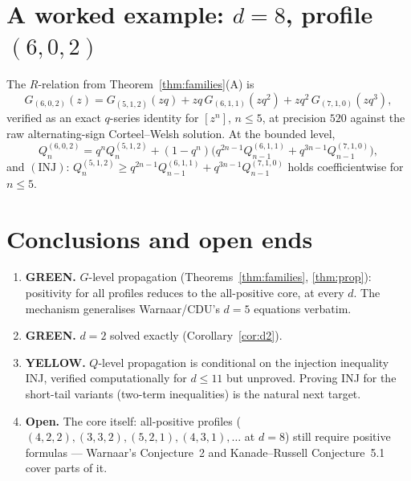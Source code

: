 \documentclass[11pt]{article}
\theoremstyle{definition}
\begin{document}
\section{A worked example: $d=8$, profile $(6,0,2)$}

The $R$-relation from Theorem~\ref{thm:families}(A) is
\[
G_{(6,0,2)}(z) = G_{(5,1,2)}(zq) + zq\,G_{(6,1,1)}(zq^2) + zq^2\,G_{(7,1,0)}(zq^3),
\]
verified as an exact $q$-series identity for $[z^n]$, $n\le 5$, at precision $520$
against the raw alternating-sign Corteel--Welsh solution. At the bounded level,
\[
Q_n^{(6,0,2)} = q^n Q_n^{(5,1,2)} + (1-q^n)\big(q^{2n-1}Q_{n-1}^{(6,1,1)}
+ q^{3n-1}Q_{n-1}^{(7,1,0)}\big),
\]
and $(\mathrm{INJ})$: $Q_n^{(5,1,2)} \ge q^{2n-1}Q_{n-1}^{(6,1,1)} + q^{3n-1}Q_{n-1}^{(7,1,0)}$
holds coefficientwise for $n\le 5$.

\section{Conclusions and open ends}

\begin{enumerate}
\item \textbf{GREEN.} $G$-level propagation (Theorems~\ref{thm:families},
\ref{thm:prop}): positivity for all profiles reduces to the all-positive core, at
every $d$. The mechanism generalises Warnaar/CDU's $d=5$ equations verbatim.
\item \textbf{GREEN.} $d=2$ solved exactly (Corollary~\ref{cor:d2}).
\item \textbf{YELLOW.} $Q$-level propagation is conditional on the injection
inequality INJ, verified computationally for $d\le 11$ but unproved. Proving INJ for
the short-tail variants (two-term inequalities) is the natural next target.
\item \textbf{Open.} The core itself: all-positive profiles ($(4,2,2),(3,3,2),(5,2,1),
(4,3,1),\dots$ at $d=8$) still require positive formulas --- Warnaar's Conjecture~2
and Kanade--Russell Conjecture~5.1 cover parts of it.
\end{enumerate}
\end{document}
